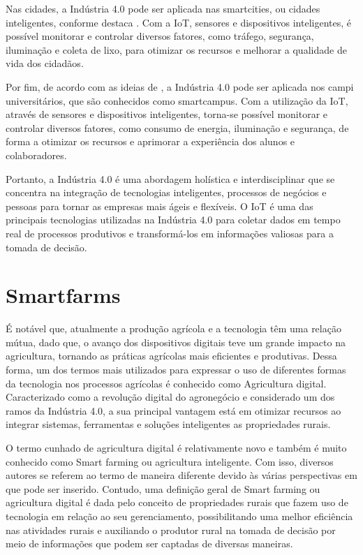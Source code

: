 \documentclass[tcc,capa]{texufpel}
\begin{document}
Nas cidades, a Indústria 4.0 pode ser aplicada nas smartcities, ou cidades inteligentes, conforme destaca \citet{Al-Fuqaha:2015}. Com a IoT, sensores e dispositivos inteligentes, é possível monitorar e controlar diversos fatores, como tráfego, segurança, iluminação e coleta de lixo, para otimizar os recursos e melhorar a qualidade de vida dos cidadãos.

Por fim, de acordo com as ideias de \citet{Xu:2018}, a Indústria 4.0 pode ser aplicada nos campi universitários, que são conhecidos como smartcampus. Com a utilização da IoT, através de sensores e dispositivos inteligentes, torna-se possível monitorar e controlar diversos fatores, como consumo de energia, iluminação e segurança, de forma a otimizar os recursos e aprimorar a experiência dos alunos e colaboradores.

Portanto, a Indústria 4.0 é uma abordagem holística e interdisciplinar que se concentra na integração de tecnologias inteligentes, processos de negócios e pessoas para tornar as empresas mais ágeis e flexíveis. O IoT é uma das principais tecnologias utilizadas na Indústria 4.0 para coletar dados em tempo real de processos produtivos e transformá-los em informações valiosas para a tomada de decisão.
\section{Smartfarms}
É notável que, atualmente a produção agrícola e a tecnologia têm uma relação mútua, dado que, o avanço dos dispositivos digitais teve um grande impacto na agricultura, tornando as práticas agrícolas mais eficientes e produtivas. Dessa forma, um dos termos mais utilizados para expressar o uso de diferentes formas da tecnologia nos processos agrícolas é conhecido como Agricultura digital. Caracterizado como a revolução digital do agronegócio e considerado um dos ramos da Indústria 4.0, a sua principal vantagem está em otimizar recursos ao integrar sistemas, ferramentas e soluções inteligentes as propriedades rurais.

O termo cunhado de agricultura digital é relativamente novo e também é muito conhecido como Smart farming ou agricultura inteligente. Com isso, diversos autores se referem ao termo de maneira diferente devido às várias perspectivas em que pode ser inserido. Contudo, uma definição geral de Smart farming ou agricultura digital é dada pelo conceito de propriedades rurais que fazem uso de tecnologia em relação ao seu gerenciamento, possibilitando uma melhor eficiência nas atividades rurais e auxiliando o produtor rural na tomada de decisão por meio de informações que podem ser captadas de diversas maneiras.
\end{document}
